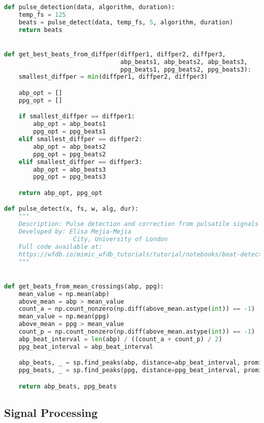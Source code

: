 \begin{lstlisting}[language=Python,label={lst:beats.py}, basicstyle=\scriptsize]
def pulse_detection(data, algorithm, duration):
    temp_fs = 125
    beats = pulse_detect(data, temp_fs, 5, algorithm, duration)
    return beats


def get_best_beats_from_diffper(diffper1, diffper2, diffper3,
                                abp_beats1, abp_beats2, abp_beats3,
                                ppg_beats1, ppg_beats2, ppg_beats3):
    smallest_diffper = min(diffper1, diffper2, diffper3)

    abp_opt = []
    ppg_opt = []

    if smallest_diffper == diffper1:
        abp_opt = abp_beats1
        ppg_opt = ppg_beats1
    elif smallest_diffper == diffper2:
        abp_opt = abp_beats2
        ppg_opt = ppg_beats2
    elif smallest_diffper == diffper3:
        abp_opt = abp_beats3
        ppg_opt = ppg_beats3

    return abp_opt, ppg_opt

def pulse_detect(x, fs, w, alg, dur):
    """
    Description: Pulse detection and correction from pulsatile signals
    Developed by: Elisa Mejia-Mejia
                   City, University of London
    Full code available at:
    https://wfdb.io/mimic_wfdb_tutorials/tutorial/notebooks/beat-detection.html
    """


def get_beats_from_mean_crossings(abp, ppg):
    mean_value = np.mean(abp)
    above_mean = abp > mean_value
    count_a = np.count_nonzero(np.diff(above_mean.astype(int)) == -1)
    mean_value = np.mean(ppg)
    above_mean = ppg > mean_value
    count_p = np.count_nonzero(np.diff(above_mean.astype(int)) == -1)
    abp_beat_interval = len(abp) / ((count_a + count_p) / 2)
    ppg_beat_interval = abp_beat_interval

    abp_beats, _ = sp.find_peaks(abp, distance=abp_beat_interval, prominence=5)
    ppg_beats, _ = sp.find_peaks(ppg, distance=ppg_beat_interval, prominence=0.01)

    return abp_beats, ppg_beats

\end{lstlisting}

\newpage

\subsection{Signal Processing}
\label{subsec:code_sp}

